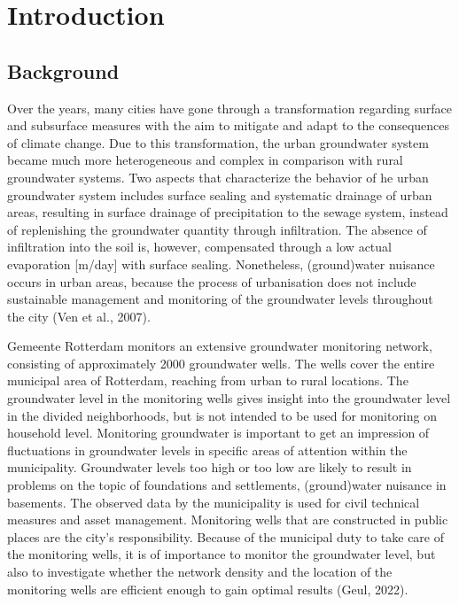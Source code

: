 \chapter{Introduction}
\label{chapter:introduction}


\section{Background}
Over the years, many cities have gone through a transformation regarding surface and subsurface measures with the aim to mitigate and adapt to the consequences of climate change. Due to this transformation, the urban groundwater system became much more heterogeneous and complex in comparison with rural groundwater systems. Two aspects that characterize the behavior of he urban groundwater system includes surface sealing and systematic drainage of urban areas, resulting in surface drainage of precipitation to the sewage system, instead of replenishing the groundwater quantity through infiltration. The absence of infiltration into the soil is, however, compensated through a low actual evaporation [m/day] with surface sealing. Nonetheless, (ground)water nuisance occurs in urban areas, because the process of urbanisation does not include sustainable management and monitoring of the groundwater levels throughout the city (Ven et al., 2007).

Gemeente Rotterdam monitors an extensive groundwater monitoring network, consisting of approximately 2000 groundwater wells. The wells cover the entire municipal area of Rotterdam, reaching from urban to rural locations. The groundwater level in the monitoring wells gives insight into the groundwater level in the divided neighborhoods, but is not intended to be used for monitoring on household level. Monitoring groundwater is important to get an impression of fluctuations in groundwater levels in specific areas of attention within the municipality. Groundwater levels too high or too low are likely to result in problems on the topic of foundations and settlements, (ground)water nuisance in basements. The observed data by the municipality is used for civil technical measures and asset management. Monitoring wells that are constructed in public places are the city's responsibility. Because of the municipal duty to take care of the monitoring wells, it is of importance to monitor the groundwater level, but also to investigate whether the network density and the location of the monitoring wells are efficient enough to gain optimal results (Geul, 2022).


